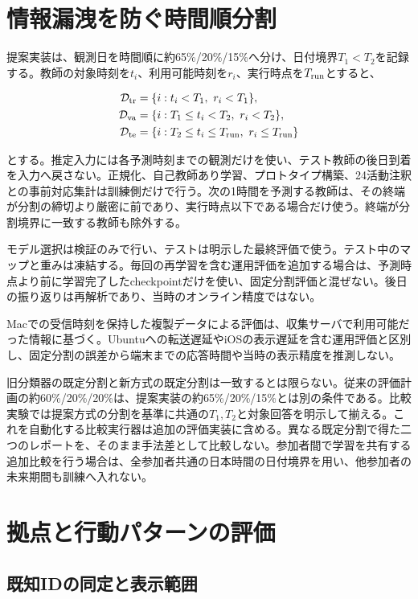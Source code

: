 \section{情報漏洩を防ぐ時間順分割}

提案実装は、観測日を時間順に約65\%/20\%/15\%へ分け、日付境界\(T_1<T_2\)を記録する。教師の対象時刻を\(t_i\)、利用可能時刻を\(r_i\)、実行時点を\(T_{\rm run}\)とすると、

\[
\begin{aligned}
\mathcal D_{\rm tr}&=\{i:t_i<T_1,\ r_i<T_1\},\\
\mathcal D_{\rm va}&=\{i:T_1\le t_i<T_2,\ r_i<T_2\},\\
\mathcal D_{\rm te}&=\{i:T_2\le t_i\le T_{\rm run},\ r_i\le T_{\rm run}\}
\end{aligned}
\]

とする。推定入力には各予測時刻までの観測だけを使い、テスト教師の後日到着を入力へ戻さない。正規化、自己教師あり学習、プロトタイプ構築、24活動注釈との事前対応集計は訓練側だけで行う。次の1時間を予測する教師は、その終端が分割の締切より厳密に前であり、実行時点以下である場合だけ使う。終端が分割境界に一致する教師も除外する。

モデル選択は検証のみで行い、テストは明示した最終評価で使う。テスト中のマップと重みは凍結する。毎回の再学習を含む運用評価を追加する場合は、予測時点より前に学習完了したcheckpointだけを使い、固定分割評価と混ぜない。後日の振り返りは再解析であり、当時のオンライン精度ではない。

Macでの受信時刻を保持した複製データによる評価は、収集サーバで利用可能だった情報に基づく。Ubuntuへの転送遅延やiOSの表示遅延を含む運用評価と区別し、固定分割の誤差から端末までの応答時間や当時の表示精度を推測しない。

旧分類器の既定分割と新方式の既定分割は一致するとは限らない。従来の評価計画の約60\%/20\%/20\%は、提案実装の約65\%/20\%/15\%とは別の条件である。比較実験では提案方式の分割を基準に共通の\(T_1,T_2\)と対象回答を明示して揃える。これを自動化する比較実行器は追加の評価実装に含める。異なる既定分割で得た二つのレポートを、そのまま手法差として比較しない。参加者間で学習を共有する追加比較を行う場合は、全参加者共通の日本時間の日付境界を用い、他参加者の未来期間も訓練へ入れない。

\section{拠点と行動パターンの評価}

\subsection{既知IDの同定と表示範囲}

